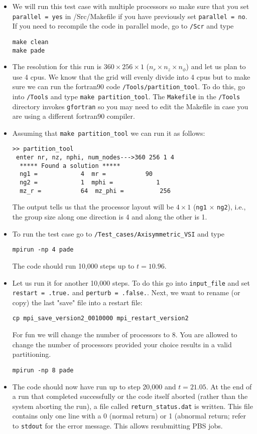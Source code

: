 \documentclass[11pt]{amsart}
\begin{document}
\begin{itemize}
\item We will run this test case with multiple processors so make sure that you set {\tt parallel = yes} in {/Src/Makefile} if you have previously set {\tt parallel = no}.  If you need to recompile the code in parallel mode, go to {\tt /Scr} and type
\begin{verbatim}
make clean
make pade
\end{verbatim}
\item The resolution for this run is $360 \times 256 \times 1$ ($n_r \times n_z \times n_\phi$) and let us plan to use 4 cpus.  We know that the grid will evenly divide into 4 cpus but to make sure we can run the fortran90 code {\tt /Tools/partition\_tool}.  To do this, go into {\tt /Tools} and type {\tt make partition\_tool}.  The {\tt Makefile} in the {\tt /Tools} directory invokes {\tt gfortran} so you may need to edit the Makefile in case you are using a different fortran90 compiler.
\item Assuming that {\tt make partition\_tool} we can run it as follows:
\begin{verbatim}
>> partition_tool
 enter nr, nz, nphi, num_nodes--->360 256 1 4
  ***** Found a solution *****
  ng1 =            4  mr =           90
  ng2 =            1  mphi =            1
  mz_r =           64  mz_phi =          256
  \end{verbatim}
The output tells us that the processor layout will be $4 \times 1$ ({\tt ng1} $\times$ {\tt ng2}), i.e., the group size along one direction is 4 and along the other is 1.
\item To run the test case go to {\tt /Test\_cases/Axisymmetric\_VSI} and type
\begin{verbatim}
mpirun -np 4 pade
\end{verbatim}
The code should run 10,000 steps up to $t = 10.96$.
\item Let us run it for another 10,000 steps.  To do this go into {\tt input\_file} and set {\tt restart = .true.} and {\tt perturb = .false.}.  Next, we want to rename (or copy) the last "save" file into a restart file:
\begin{verbatim}
cp mpi_save_version2_0010000 mpi_restart_version2
\end{verbatim}
For fun we will change the number of processors to 8.  You are allowed to change the number of processors provided your choice results in a valid partitioning.
\begin{verbatim}
mpirun -np 8 pade
\end{verbatim}
\item The code should now have run up to step 20,000 and $t = 21.05$.  At the end of a run that completed successfully or the code itself aborted (rather than the system aborting the run), a file called {\tt return\_status.dat} is written.  This file contains only one line with a 0 (normal return) or 1 (abnormal return; refer to {\tt stdout} for the error message. This allows resubmitting PBS jobs.  
\end{itemize}
\end{document}
